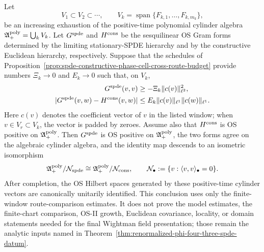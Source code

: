 \begin{proposition}
\label{prop:spde-directed-os-prehilbert-comparison}
Let
\[
  V_1\subset V_2\subset\cdots,\qquad
  V_k=\operatorname{span}\{F_{k,1},\ldots,F_{k,m_k}\},
\]
be an increasing exhaustion of the positive-time polynomial cylinder algebra
\(\mathfrak A_+^{\rm poly}=\bigcup_kV_k\).  Let
\(G^{\rm spde}\) and \(H^{\rm cons}\) be the sesquilinear OS Gram forms
determined by the limiting stationary-SPDE hierarchy and by the constructive
Euclidean hierarchy, respectively.  Suppose that the schedules of
Proposition~\ref{prop:spde-constructive-phase-cell-cross-route-budget}
provide numbers \(\Xi_k\to0\) and \(E_k\to0\) such that, on \(V_k\),
\begin{align}
  G^{\rm spde}(v,v)&\geq-\Xi_k\|c(v)\|_{\ell^2}^2,
  \label{eq:spde-directed-os-lower-defect}\\
  |G^{\rm spde}(v,w)-H^{\rm cons}(v,w)|
  &\leq E_k\|c(v)\|_{\ell^1}\|c(w)\|_{\ell^1}.
  \label{eq:spde-directed-os-entry-comparison}
\end{align}
Here \(c(v)\) denotes the coefficient vector of \(v\) in the listed window;
when \(v\in V_r\subset V_k\), the vector is padded by zeroes.  Assume also
that \(H^{\rm cons}\) is OS positive on \(\mathfrak A_+^{\rm poly}\).  Then
\(G^{\rm spde}\) is OS positive on \(\mathfrak A_+^{\rm poly}\), the two
forms agree on the algebraic cylinder algebra, and the identity map descends
to an isometric isomorphism
\[
  \mathfrak A_+^{\rm poly}/\mathcal N_{\rm spde}
  \cong
  \mathfrak A_+^{\rm poly}/\mathcal N_{\rm cons},
  \qquad
  \mathcal N_{\bullet}
  :=
  \{v:\langle v,v\rangle_{\bullet}=0\}.
\]
After completion, the OS Hilbert spaces generated by these positive-time
cylinder vectors are canonically unitarily identified.  This conclusion uses
only the finite-window route-comparison estimates.  It does not prove the
model estimates, the finite-chart comparison, OS-II growth, Euclidean
covariance, locality, or domain statements needed for the final Wightman
field presentation; those remain the analytic inputs named in
Theorem~\ref{thm:renormalized-phi-four-three-spde-datum}.
\end{proposition}

